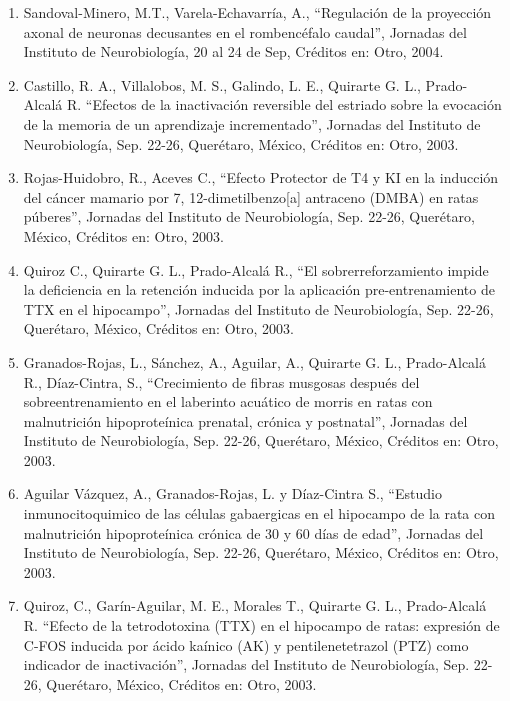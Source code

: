 \begin{enumerate}
\item Sandoval-Minero, M.T., Varela-Echavarría, A., “Regulación de la proyección axonal de neuronas decusantes en el 
rombencéfalo caudal”, Jornadas del Instituto de Neurobiología, 20 al 24 de Sep, Créditos en: Otro, 2004.

\item Castillo, R. A., Villalobos, M. S., Galindo, L. E., Quirarte G. L., Prado-Alcalá R. “Efectos de la inactivación 
reversible del estriado sobre la evocación de la memoria de un aprendizaje incrementado”, Jornadas del Instituto de 
Neurobiología, Sep. 22-26, Querétaro, México, Créditos en: Otro, 2003.

\item Rojas-Huidobro, R., Aceves C., “Efecto Protector de T4 y KI en la inducción del cáncer mamario por 7, 
12-dimetilbenzo[a] antraceno (DMBA) en ratas púberes”, Jornadas del Instituto de Neurobiología, Sep. 22-26, Querétaro, 
México, Créditos en: Otro, 2003.

\item Quiroz C., Quirarte G. L., Prado-Alcalá R., “El sobrerreforzamiento impide la deficiencia en la retención inducida por 
la aplicación pre-entrenamiento de TTX en el hipocampo”, Jornadas del Instituto de Neurobiología, Sep. 22-26, Querétaro, 
México, Créditos en: Otro, 2003.

\item Granados-Rojas, L., Sánchez, A., Aguilar, A., Quirarte G. L., Prado-Alcalá R., Díaz-Cintra, S., “Crecimiento de fibras 
musgosas después del sobreentrenamiento en el laberinto acuático de morris en ratas con malnutrición hipoproteínica 
prenatal, crónica y postnatal”, Jornadas del Instituto de Neurobiología, Sep. 22-26, Querétaro, México, Créditos en: Otro, 
2003.

\item Aguilar Vázquez, A., Granados-Rojas, L. y Díaz-Cintra S., “Estudio inmunocitoquimico de las células gabaergicas en el 
hipocampo de la rata con malnutrición hipoproteínica crónica de 30 y 60 días de edad”, Jornadas del Instituto de Neurobiología, Sep. 22-26, 
Querétaro, México, Créditos en: Otro, 
2003.

\item Quiroz, C., Garín-Aguilar, M. E., Morales T., Quirarte G. L., Prado-Alcalá R. “Efecto de la tetrodotoxina (TTX) en el 
hipocampo de ratas: expresión de C-FOS inducida por ácido kaínico (AK) y pentilenetetrazol (PTZ) como indicador de 
inactivación”, Jornadas del Instituto de Neurobiología, Sep. 22-26, Querétaro, México, Créditos en: Otro, 2003.


\end{enumerate}
